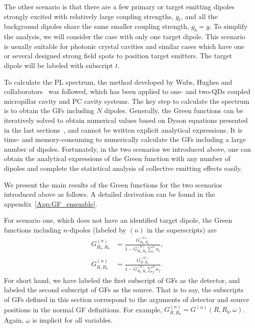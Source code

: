 The other scenario is that there are a few primary or target emitting dipoles strongly excited with relatively large coupling strengths, $g_t$, and all the background dipoles share the same smaller coupling strength, $g_b=g$. To simplify the analysis, we will consider the case with only one target dipole. This scenario is usually suitable for photonic crystal cavities and similar cases which have one or several designed strong field spots to position target emitters. The target dipole will be labeled with subscript $t$.

To calculate the PL spectrum, the method developed by Wubs, Hughes and collaborators~\cite{Wubs2004,Kristensen2011,Wubs2012} was followed, which has been applied to one- and two-QDs coupled micropillar cavity and PC cavity systems\cite{Yao2009b,Yao2009c,Yao2009a,VanVlack2011,Reitzenstein2010,Hughes2009,Kristensen2011}. The key step to calculate the spectrum is to obtain the GFs including $N$ dipoles. Generally, the Green functions can be iteratively solved to obtain numerical values based on Dyson equations presented in the last sections~\cite{Wubs2004}, and cannot be written explicit analytical expressions. It is time- and memory-consuming to numerically calculate the GFs including a large number of dipoles. Fortunately, in the two scenarios we introduced above, one can obtain the analytical expressions of the Green function with any number of dipoles and complete the statistical analysis of collective emitting effects easily.

We present the main results of the Green functions for the two scenarios introduced above as follows. A detailed derivation can be found in the appendix~\ref{App:GF_ensemble}.

For scenario one, which does not have an identified target dipole, the Green functions including $n$-dipoles (labeled by $(n)$ in the superscripts) are
\begin{align}
\label{Gn11}
 G^{(n)}_{R_b,R_b}&=\frac{G^{(0)}_{R_b,R_b}}{1-G^{(0)}_{R_b,R_b}\sum_i^n{\alpha_i}},\\
\label{GnR1}
 G^{(n)}_{R,R_b}&=\frac{G^{(0)}_{R,R_b}}{1-G^{(0)}_{R_b,R_b}\sum_j^n{\alpha_j}}.
\end{align}
For short hand, we have labeled the first subscript of GFs as the detector,
and labeled the second subscript of GFs as the source.
That is to say, the subscripts of GFs defined in this section correspond to the arguments of detector and source positions in the normal GF definitions. For example, $G^{(n)}_{R,R_b}=G^{(n)}(R,R_b,\omega)$. Again, $\omega$ is implicit for all variables.

